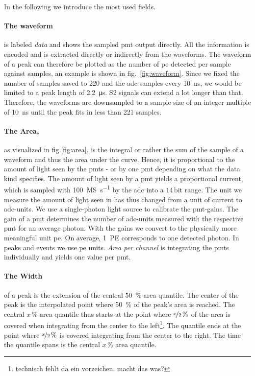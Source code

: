In the following we introduce the most used fields.

\paragraph{The waveform} is labeled \emph{data} and shows the sampled \gls{pmt} output directly.
All the information is encoded and is extracted directly or indirectly from the  waveforms.
The waveform of a peak can therefore be plotted as the number of \gls{pe} detected per sample against samples, an example is shown in fig.~\ref{fig:waveform}.
Since we fixed the number of samples saved to 220 and the \gls{adc} samples every \SI{10}{\nano\second}, we would be limited to a peak length of \SI{2.2}{\micro\second}.
S2 signals can extend a lot longer than that.
Therefore, the waveforms are downsampled to a sample size of an integer multiple of \SI{10}{\nano\second} until the peak fits in less than 221 samples.

\paragraph{The Area,} as visualized in fig.\ref{fig:area}, is the integral or  rather the sum of the sample of a waveform and thus the area under the curve.
Hence, it is proportional to the amount of light seen by the \glspl{pmt} - or by one \gls{pmt} depending on what the data kind specifies.
The amount of light seen by a \gls{pmt} yields a proportional current, which is sampled with \SI{100}{\mega S\per\second} by the \gls{adc} into a $ 14\,\mathrm{bit} $ range.
The unit we measure the amount of light seen in has thus changed from a unit of current to \gls{adc}-units.
We use a single-photon light source to calibrate the \gls{pmt}-gains.
The gain of a \gls{pmt} determines the number of \gls{adc}-units measured with the respective \gls{pmt} for an average photon.
With the gains we convert to the physically more meaningful unit \gls{pe}.
On average, \SI{1}{PE} corresponds to one detected photon.
In peaks and events we use \gls{pe} units.
\emph{Area per channel} is integrating the \glspl{pmt} individually and yields one value per \gls{pmt}.

\paragraph{The Width} of a peak is the extension of the central \SI{50}{\%} area quantile.
The center of the peak is the interpolated point where \SI{50}{\%} of the peak's area is reached.
The central $ x\,\% $ area quantile thus starts at the point where $ \nicefrac{x}{2}\,\% $ of the area is covered when integrating from the center to the left\footnote{technisch fehlt da ein vorzeichen. macht das was?}.
The quantile ends at the point where $ \nicefrac{x}{2}\,\% $ is covered integrating from the center to the right.
The time the quantile spans is the central $ x\,\% $ area quantile.


